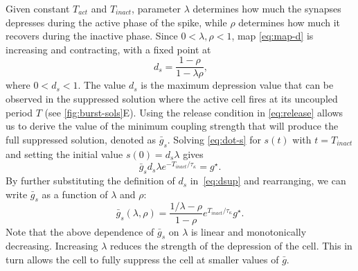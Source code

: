 Given constant \(T_{act}\) and \(T_{inact}\), parameter \(\lambda\) determines how much the synapses depresses during the active phase of the spike, while \(\rho\) determines how much it recovers during the inactive phase.
Since \(0<\lambda, \rho<1\), map \cref{eq:map-d} is increasing and contracting, with a fixed point at
\begin{equation}
	~\label{eq:dsup}
	d_{s}=\frac{1-\rho}{1-\lambda\rho},
\end{equation}
where \(0<d_{s}<1\).
The value \(d_{s}\) is the maximum depression value that can be observed in the suppressed solution where the active cell fires at its uncoupled period \(T\) (see \cref{fig:burst-sols}E).
Using the release condition in \cref{eq:release} allows us to derive the value of the minimum coupling strength that will produce the full suppressed solution, denoted as \(\bar g_{s}\).
Solving \cref{eq:dot-s} for \(s(t)\) with \(t=T_{inact}\) and setting the initial value \(s(0)=d_s\lambda\) gives \begin{equation}
	\bar g_s d_s\lambda e^{-T_{inact}/\tau_\kappa}=g^{\star}.
\end{equation}
By further substituting the definition of \(d_s\) in~\eqref{eq:dsup} and rearranging, we can write \(\bar g_s\) as a function of \(\lambda\) and \(\rho\):
\begin{equation}
	\label{eq:gs}
	\bar g_s(\lambda, \rho) = \frac{1/\lambda-\rho}{1-\rho} e^{T_{inact}/\tau_\kappa}g^\star.
\end{equation}
Note that the above dependence of \(\bar g_{s}\) on \(\lambda\) is linear and monotonically decreasing.
Increasing \(\lambda\) reduces the strength of the depression of the \free{} cell.
This in turn allows the \free{} cell to fully suppress the \quiet{} cell at smaller values of \(\bar g\).

